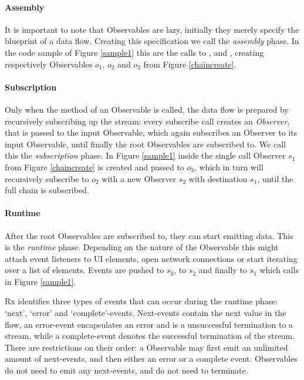 \paragraph{Assembly} It is important to note that Observables are lazy, initially they merely specify the blueprint of a data flow. 
Creating this specification we call the \textit{assembly} phase. In the code sample of Figure \ref{sample1} this are the calls to ,  and , creating respectively Observables $o_1$, $o_2$ and $o_3$ from Figure \ref{chaincreate}.

\paragraph{Subscription} Only when the  method of an Observable is called, the data flow is prepared by recursively subscribing up the stream: every subscribe call creates an \textit{Observer}, that is passed to the input Observable, which again subscribes an Observer to its input Observable, until finally the root Observables are subscribed to. We call this the \textit{subscription} phase. In Figure \ref{sample1} inside the single  call Observer $s_1$ from Figure \ref{chaincreate} is created and passed to $o_3$, which in turn will recursively subscribe to $o_2$ with a new Observer $s_2$ with destination $s_1$, until the full chain is subscribed.

\paragraph{Runtime} After the root Observables are subscribed to, they can start emitting data. This is the \textit{runtime} phase. Depending on the nature of the Observable this might attach event listeners to UI elements, open network connections or start iterating over a list of elements. Events are pushed to $s_3$, to $s_2$ and finally to $s_1$ which calls  in Figure \ref{sample1}. 

Rx identifies three types of events that can occur during the runtime phase: `next', `error' and `complete'-events. Next-events contain the next value in the flow, an error-event encapsulates an error and is a unsuccessful termination to a stream, while a complete-event denotes the successful termination of the stream. There are restrictions on their order: a Observable may first emit an unlimited amount of next-events, and then either an error or a complete event. Observables do not need to emit any next-events, and do not need to terminate.

